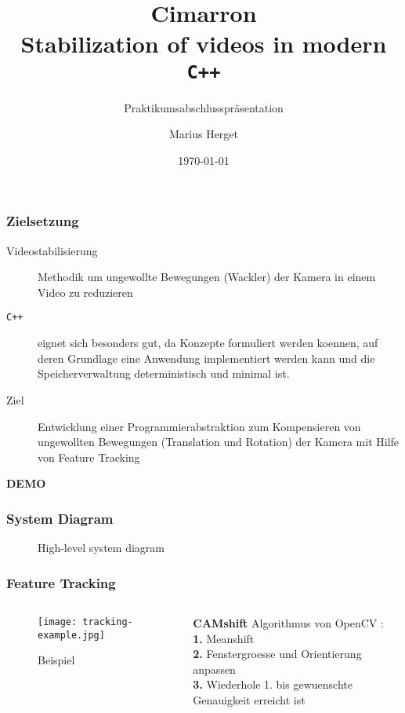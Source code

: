 \documentclass{beamer}
\title{\textbf{Cimarron}\\Stabilization of videos in modern \texttt{C++}}
\subtitle{Praktikumsabschlusspr\"asentation}
\author{Marius Herget}
\date{\today}
\institute{Institut f\"ur Informatik, LMU M\"unchen}
\newcommand{\currentSD}{}
\begin{document}
\frame{\titlepage}

\begin{frame}
\frametitle{Zielsetzung}
\begin{description}
    \item[Videostabilisierung] Methodik um ungewollte Bewegungen (Wackler) der Kamera in einem Video zu reduzieren
    \item[\texttt{C++}] eignet sich besonders gut, da Konzepte formuliert werden koennen, auf deren Grundlage eine Anwendung implementiert werden kann und die Speicherverwaltung deterministisch und minimal ist.
    \item[Ziel] Entwicklung einer Programmierabstraktion zum Kompensieren von ungewollten Bewegungen (Translation und Rotation) der Kamera mit Hilfe von Feature Tracking
\end{description}
\end{frame}

\begin{frame}
\begin{center}
    \textbf{\huge DEMO}
\end{center}
\end{frame}

\begin{frame}
    \frametitle{System Diagram}
    \begin{figure}[h!]
        \resizebox{\textwidth}{!}{%
        }
        \caption{High-level system diagram}
    \end{figure}
\end{frame}

\begin{frame}
\frametitle{Feature Tracking}
    \begin{columns}
    \begin{column}{0.3\textwidth}
        \begin{figure}
            \texttt{[image: tracking-example.jpg]}
            \caption{Beispiel}
        \end{figure}
    \end{column}
    \begin{column}{0.67\textwidth}
            \textbf{CAMshift} Algorithmus von OpenCV \cite{OpenCVMe72:online}:\\[0.7em]
                \textbf{1.} Meanshift\\
                \textbf{2.} Fenstergroesse und Orientierung anpassen\\
                \textbf{3.} Wiederhole 1. bis gewuenschte Genauigkeit erreicht ist
    \end{column}
    \end{columns}
    \renewcommand{\currentSD}{\draw[red,thick,dotted] ($(analysis1.north west)+(-0.2,0.2)$)  rectangle ($(analysis1.south east)+(0.2,-0.2)$);}
    
\end{frame}
\end{document}
